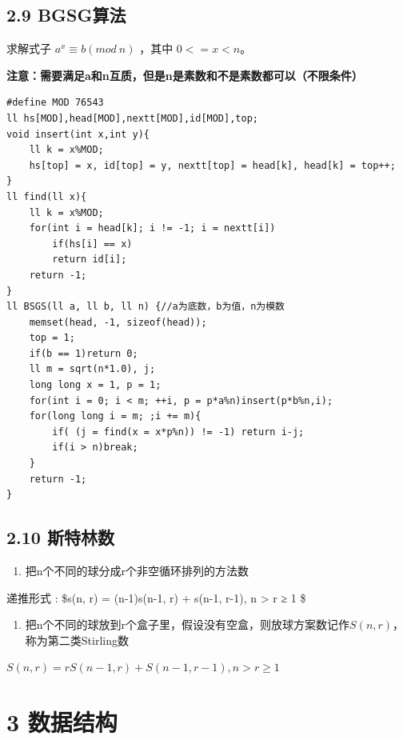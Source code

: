 \documentclass[11pt]{article}		%
\providecommand{\tightlist}{%
  \setlength{\itemsep}{0pt}\setlength{\parskip}{0pt}}
\begin{document}
\subsection{2.9 BGSG算法}\label{bgsgux7b97ux6cd5}

求解式子 \(a^x \equiv b (mod \ n)\) ，其中 \(0 <= x < n\)。

\textbf{注意：需要满足a和n互质，但是n是素数和不是素数都可以（不限条件）}

\begin{verbatim}
#define MOD 76543
ll hs[MOD],head[MOD],nextt[MOD],id[MOD],top;
void insert(int x,int y){
    ll k = x%MOD;
    hs[top] = x, id[top] = y, nextt[top] = head[k], head[k] = top++;
}
ll find(ll x){
    ll k = x%MOD;
    for(int i = head[k]; i != -1; i = nextt[i])
        if(hs[i] == x)
        return id[i];
    return -1;
}
ll BSGS(ll a, ll b, ll n) {//a为底数，b为值，n为模数
    memset(head, -1, sizeof(head));
    top = 1;
    if(b == 1)return 0;
    ll m = sqrt(n*1.0), j;
    long long x = 1, p = 1;
    for(int i = 0; i < m; ++i, p = p*a%n)insert(p*b%n,i);
    for(long long i = m; ;i += m){
        if( (j = find(x = x*p%n)) != -1) return i-j;
        if(i > n)break;
    }
    return -1;
}
\end{verbatim}

\subsection{2.10 斯特林数}\label{ux65afux7279ux6797ux6570}

\begin{enumerate}
\def\labelenumi{\arabic{enumi}.}
\tightlist
\item
  把n个不同的球分成r个非空循环排列的方法数
\end{enumerate}

递推形式 : \$s(n, r) = (n-1)s(n-1, r) + s(n-1, r-1), n \textgreater{} r
≥ 1 \$

\begin{enumerate}
\def\labelenumi{\arabic{enumi}.}
\setcounter{enumi}{1}
\tightlist
\item
  把n个不同的球放到r个盒子里，假设没有空盒，则放球方案数记作\(S(n,r)\)，称为第二类Stirling数
\end{enumerate}

\(S(n,r)=rS(n−1,r)+S(n−1,r−1),n>r≥1\) \newpage
 \pagestyle{fancy}


\section{3 数据结构}\label{ux6570ux636eux7ed3ux6784}
\end{document}
